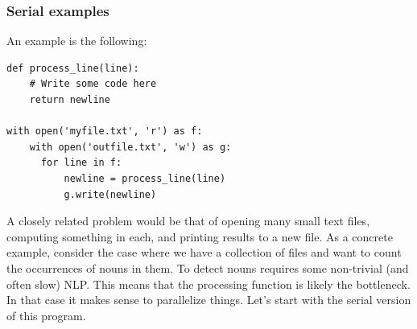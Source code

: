 \subsubsection{Serial examples}
An example is the following:
\begin{verbatim}
def process_line(line):
    # Write some code here
    return newline

with open('myfile.txt', 'r') as f:
    with open('outfile.txt', 'w') as g:
      for line in f:
          newline = process_line(line)
          g.write(newline)
\end{verbatim}
A closely related problem would be that of opening many small text files, computing something in each, and printing results to a new file.  As a concrete example, consider the case where we have a collection of files and want to count the occurrences of nouns in them.  To detect nouns requires some non-trivial (and often slow) NLP.  This means that the processing function is likely the bottleneck.  In that case it makes sense to parallelize things.  Let's start with the serial version of this program.

